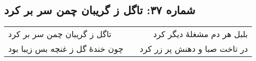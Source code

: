 \begin{center}
\section*{شماره ۳۷: تاگل ز گریبان چمن سر بر کرد}
\label{sec:037}
\begin{longtable}{l p{0.5cm} r}
تاگل ز گریبان چمن سر بر کرد
&&
بلبل هر دم مشغلهٔ دیگر کرد
\\
چون خندهٔ گل ز غنچه بس زیبا بود
&&
در تاخت صبا و دهنش پر زر کرد
\\
\end{longtable}
\end{center}

